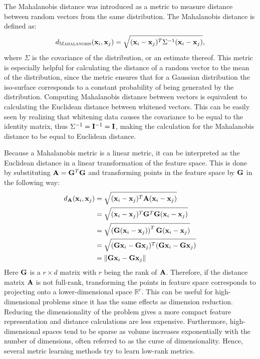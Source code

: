 \begin{textbox}
The Mahalanobis distance was introduced as a metric to measure distance between random vectors from the same distribution. \cite{mahalanobis1936generalised} The Mahalanobis distance is defined as:
\begin{equation}
d_{\textsc{Mahalanobis}}(\vec{x}_i, \vec{x}_j) = \sqrt{(\vec{x}_i - \vec{x}_j)^T\Sigma^{-1}(\vec{x}_i - \vec{x}_j)},
\end{equation}
where $\Sigma$ is the covariance of the distribution, or an estimate thereof. This metric is especially helpful for calculating the distance of a random vector to the mean of the distribution, since the metric ensures that for a Gaussian distribution the iso-surface corresponds to a constant probability of being generated by the distribution. Computing Mahalanobis distance between vectors is equivalent to calculating the Euclidean distance between whitened vectors. This can be easily seen by realizing that whitening data causes the covariance to be equal to the identity matrix, thus $\Sigma^{-1} = \mat{I}^{-1} = \mat{I}$, making the calculation for the Mahalanobis distance to be equal to Euclidean distance.
\caption{}
\label{tb:mahalanobis}
\end{textbox}

Because a Mahalanobis metric is a linear metric, it can be interpreted as the Euclidean distance in a linear transformation of the feature space. This is done by substituting $\mat{A} = \mat{G}^T\mat{G}$ and transforming points in the feature space by $\mat{G}$ in the following way:
\begin{align}
d_{\mat{A}}(\vec{x}_i, \vec{x}_j) & = \sqrt{(\vec{x}_i - \vec{x}_j)^T\mat{A}(\vec{x}_i - \vec{x}_j)}\nonumber \\
& =  \sqrt{(\vec{x}_i - \vec{x}_j)^T\mat{G}^T\mat{G}(\vec{x}_i - \vec{x}_j)} \nonumber \\
& =  \sqrt{\left(\mat{G}(\vec{x}_i - \vec{x}_j)\right)^T \mat{G}(\vec{x}_i - \vec{x}_j)} \nonumber \\
& =  \sqrt{(\mat{G}\vec{x}_i - \mat{G}\vec{x}_j)^T(\mat{G}\vec{x}_i - \mat{G}\vec{x}_j)} \nonumber \\
& =  \|\mat{G}\vec{x}_i - \mat{G}\vec{x}_j\|
\end{align}
Here $\mat{G}$ is a $r \times d$ matrix with $r$ being the rank of $\mat{A}$.  Therefore, if the distance matrix $\mat{A}$ is not full-rank, transforming the points in feature space corresponds to projecting onto a lower-dimensional space $\mathbb{R}^r$. This can be useful for high-dimensional problems since it has the same effects as dimension reduction. Reducing the dimensionality of the problem gives a more compact feature representation and distance calculations are less expensive. Furthermore, high-dimensional spaces tend to be sparse as volume increases exponentially with the number of dimensions, often referred to as the curse of dimensionality. Hence, several metric learning methods try to learn low-rank metrics.

